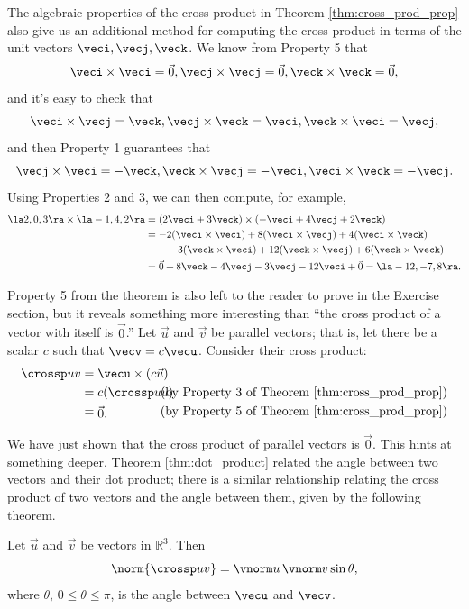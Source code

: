 The algebraic properties of the cross product in Theorem \ref{thm:cross_prod_prop} also give us an additional method for computing the cross product in terms of the unit vectors $\veci, \vecj, \veck$. We know from Property 5 that
\[
\veci\times\veci = \vec 0, \vecj\times\vecj = \vec 0, \veck\times\veck = \vec 0,
\]
and it's easy to check that
\[
\veci\times\vecj = \veck, \vecj\times\veck = \veci, \veck\times\veci=\vecj,
\]
and then Property 1 guarantees that
\[
\vecj\times \veci = -\veck, \veck\times\vecj = -\veci, \veci\times\veck = -\vecj.
\]
Using Properties 2 and 3, we can then compute, for example,
\begin{align*}
\la 2,0,3\ra\times \la -1,4,2\ra & = (2\veci +3\veck)\times (-\veci +4\vecj +2\veck)\\
& = -2(\veci \times \veci)+8(\veci \times\vecj)+4(\veci \times\veck)\\
& \quad \quad-3(\veck\times\veci)+12(\veck\times\vecj)+6(\veck\times\veck)\\
& = \vec 0+8\veck -4\vecj -3\vecj -12\veci + \vec 0 = \la -12, -7, 8\ra.
\end{align*}

Property 5 from the theorem is also left to the reader to prove in the Exercise section, but it reveals something more interesting than ``the cross product of a vector with itself is $\vec 0$.'' Let $\vec u$ and $\vec v$ be parallel vectors; that is, let there be a scalar $c$ such that $\vecv = c\vecu$. Consider their cross product:
\begin{align*}
\crossp uv &= \vecu \times (c\vec u) \\
					&=	\parbox{50pt}{$c(\crossp uu)$}\text{(by Property 3 of Theorem \ref{thm:cross_prod_prop})}\\
					&= \parbox{50pt}{$\vec 0$.}\text{(by Property 5 of Theorem \ref{thm:cross_prod_prop})}
\end{align*}

We have just shown that the cross product of parallel vectors is $\vec 0$. This hints at something deeper. Theorem \ref{thm:dot_product} related the angle between two vectors and their dot product; there is a similar relationship relating the cross product of two vectors and the angle between them, given by the following theorem.

{Let $\vec u$ and $\vec v$ be vectors in $\mathbb{R}^3$. Then
\[
\norm{\crossp uv} = \vnorm u\, \vnorm v \sin\theta,
\]
where $\theta$, $0\leq \theta \leq \pi$, is the angle between $\vecu$ and $\vecv$.
}

